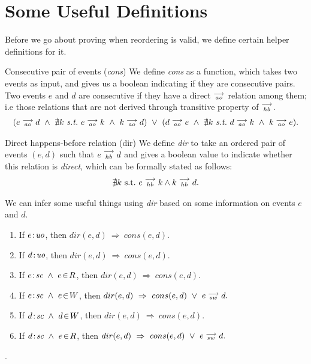 \section{Some Useful Definitions}
Before we go about proving when reordering is valid, we define certain helper definitions for it.

\begin{definition}{Consecutive pair of events (\emph{cons})}
    \label{Cons}
    We define \emph{cons} as a function, which takes two events as input, and gives us a boolean indicating if they are consecutive pairs. Two events $e$ and $d$ are consecutive if they have a direct $\stackrel{\longrightarrow}{_\textit{ao}}$ relation among them;  i.e those relations that are not derived through transitive property of $\stackrel{\longrightarrow}{_\textit{hb}}$. 
    \begin{align*}
        (
        e \stck{_\textit{ao}} d  \ \wedge \ 
        \nexists k \ \textit{s.t.} \ 
        e \stck{_\textit{ao}} k  \ \wedge \
        k \stck{_\textit{ao}} d 
        )
        \ \vee \
        (
            d \stck{_\textit{ao}} e  \ \wedge \ 
            \nexists k \ \textit{s.t.} \ 
            d \stck{_\textit{ao}} k  \ \wedge \
            k \stck{_\textit{ao}} e  
        ).
    \end{align*}
\end{definition}

\begin{definition}{Direct happens-before relation (dir)}
    \label{Dir}
    We define \emph{dir} to take an ordered pair of events $(e,d)$ such that $e\stackrel{\longrightarrow}{_{hb}}d$ and gives a boolean value to indicate whether this relation is \textit{direct}, which can be formally stated as follows:
    \begin{align*}
        \nexists k \ \text{s.t.} \ e\stackrel{\longrightarrow}{_{hb}}k \wedge k\stackrel{\longrightarrow}{_{hb}}d.
    \end{align*}
    
    We can infer some useful things using \emph{dir} based on some information on events $e$ and $d$\footnotemark. 
    \begin{enumerate}
        \item If $e\!:\!\textit{uo}$, then $dir(e,d) \ \Rightarrow \ cons(e,d).$ 
        \item If $d\!:\!\textit{uo}$, then $dir(e,d) \ \Rightarrow \ cons(e,d).$
        \item If $\et{e}{sc}\ \wedge\ e\!\in\!R$, then $dir(e,d) \ \Rightarrow \ cons(e,d).$
        \item If $\et{e}{sc}\ \wedge\ e\!\in\!W$, then $dir(e,d) \ \Rightarrow \ cons(e,d)\ \vee\ \reln{e}{sw}{d}.$
        \item If $\et{d}{sc}\ \wedge\ d\!\in\!W$, then $dir(e,d) \ \Rightarrow \ cons(e,d).$
        \item If $\et{d}{sc}\ \wedge\ e\!\in\!R$, then $dir(e,d) \ \Rightarrow \ cons(e,d)\ \vee\ \reln{e}{sw}{d}.$
    \end{enumerate}

    .
\end{definition}


